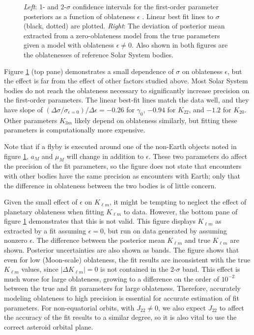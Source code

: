 \documentclass[fleqn,usenatbib]{mnras}
\begin{document}
\begin{figure}
  \caption{\textit{Left}: 1- and 2-$\sigma$ confidence intervals for the first-order parameter posteriors as a function of oblateness $\epsilon$ . Linear best fit lines to $\sigma$ (black, dotted) are plotted. \textit{Right}: The deviation of posterior mean extracted from a zero-oblateness model from the true parameters given a model with oblateness $\epsilon \neq 0$. Also shown in both figures are the oblatenesses of reference Solar System bodies.}
  \label{fig:scan-oblateness}
\end{figure}

Figure \ref{fig:scan-oblateness} (top pane) demonstrates a small dependence of $\sigma$ on oblateness $\epsilon$, but the effect is far from the effect of other factors studied above. Most Solar System bodies do not reach the oblateness necessary to significantly increase precision on the first-order parameters. The linear best-fit lines match the data well, and they have slope of $(\Delta \sigma / \sigma_{\epsilon=0}) / \Delta \epsilon = -0.26$ for $\gamma_0$, $-0.94$ for $K_{22}$, and $-1.2$ for $K_{20}$. Other parameters $K_{3m}$ likely depend on oblateness similarly, but fitting these parameters is computationally more expensive.

Note that if a flyby is executed around one of the non-Earth objects noted in figure \ref{fig:scan-oblateness}, $a_M$ and $\mu_M$ will change in addition to $\epsilon$. These two parameters do affect the precision of the fit parameters, so the figure does not state that encounters with other bodies have the same precision as encounters with Earth; only that the difference in oblateness between the two bodies is of little concern.

Given the small effect of $\epsilon$ on $K_{\ell m}$, it might be tempting to neglect the effect of planetary oblateness when fitting $K_{\ell m}$ to data. However, the bottom pane of figure \ref{fig:scan-oblateness} demonstrates that this is not valid. This figure displays $K_{\ell m}$ as extracted by a fit assuming $\epsilon = 0$, but run on data generated by assuming nonzero $\epsilon$. The difference between the posterior mean $K_{\ell m}$ and true $K_{\ell m}$ are shown. Posterior uncertainties are also shown as bands. The figure shows that even for low (Moon-scale) oblateness, the fit results are inconsistent with the true $K_{\ell m}$ values, since $|\Delta K_{\ell m}| = 0$ is not contained in the 2-$\sigma$ band. This effect is much worse for large oblateness, growing to a difference on the order of $10^{-2}$ between the true and fit parameters for large oblateness. Therefore, accurately modeling oblateness to high precision is essential for accurate estimation of fit parameters. For non-equatorial orbits, with $J_{22} \neq 0$, we also expect $J_{22}$ to affect the accuracy of the fit results to a similar degree, so it is also vital to use the correct asteroid orbital plane.
\end{document}
